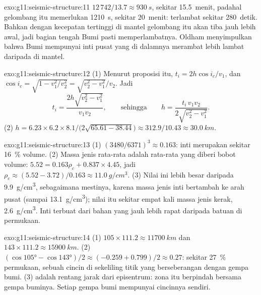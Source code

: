 \begin{solution}{exo:g11:seismic-structure:11}
$12\,742/13.7 \approx \qty{930}{s}$, sekitar 15.5~menit, padahal gelombang itu
memerlukan \qty{1210}{s}, sekitar 20~menit: terlambat sekitar 280~detik. Bahkan
dengan kecepatan tertinggi di mantel gelombang itu akan tiba jauh lebih awal,
jadi bagian tengah Bumi pasti memperlambatnya. Oldham menyimpulkan bahwa Bumi
mempunyai inti pusat yang di dalamnya  merambat lebih lambat daripada
di mantel.
\end{solution}

\begin{solution}{exo:g11:seismic-structure:12}
(1) Menurut proposisi itu, $t_i = 2h\cos i_c/v_1$, dan $\cos i_c = \sqrt{1 -
v_1^2/v_2^2} = \sqrt{v_2^2 - v_1^2}/v_2$. Jadi
\[
  t_i = \frac{2h\sqrt{v_2^2 - v_1^2}}{v_1 v_2},
  \qquad\text{sehingga}\qquad
  h = \frac{t_i\,v_1 v_2}{2\sqrt{v_2^2 - v_1^2}}.
\]
(2) $h = 6.23 \times 6.2 \times 8.1/\bigl(2\sqrt{65.61 -
38.44}\bigr) \approx 312.9/10.43 \approx \qty{30.0}{km}$.
\end{solution}

\begin{solution}{exo:g11:seismic-structure:13}
(1) $(3480/6371)^3 \approx 0.163$: inti merupakan sekitar \qty{16}{\percent}
volume. (2) Massa jenis rata-rata adalah rata-rata yang diberi bobot volume: $5.52 = 0.163
\rho_c + 0.837 \times 4.45$, jadi $\rho_c \approx (5.52 - 3.72)/0.163 \approx
\qty{11.0}{g/cm^3}$. (3) Nilai ini lebih besar daripada \qty{9.9}{g/cm^3},
sebagaimana mestinya, karena massa jenis inti bertambah ke arah pusat (sampai
\qty{13.1}{g/cm^3}); nilai itu sekitar empat kali massa jenis kerak,
\qty{2.6}{g/cm^3}. Inti terbuat dari bahan yang jauh lebih rapat daripada
batuan di permukaan.
\end{solution}

\begin{solution}{exo:g11:seismic-structure:14}
(1) $105 \times 111.2 \approx \qty{11700}{km}$ dan $143 \times 111.2 \approx
\qty{15900}{km}$. (2) $(\cos\ang{105} - \cos\ang{143})/2 \approx (-0.259 +
0.799)/2 \approx 0.27$: sekitar \qty{27}{\percent} permukaan, sebuah cincin di
sekeliling titik yang berseberangan dengan gempa bumi. (3)  adalah
rentang jarak dari episentrum: zona itu berpindah bersama gempa buminya. Setiap
gempa bumi mempunyai cincinnya sendiri.
\end{solution}


